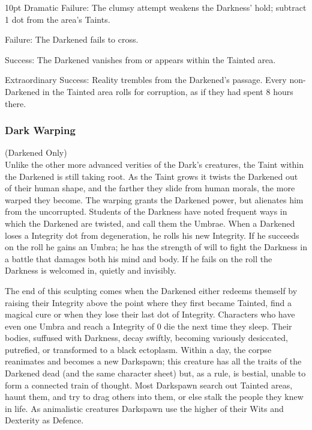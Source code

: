\begin{myindentpar}{10pt}
    Dramatic Failure: The clumsy attempt weakens the Darkness' hold; subtract 1 dot from the area's Taints. 
    
    Failure: The Darkened fails to cross. 
    
    Success: The Darkened vanishes from or appears within the Tainted area. 
    
    Extraordinary Success: Reality trembles from the Darkened's passage. Every non-Darkened in the Tainted area rolls for corruption, as if they had spent 8 hours there. 
\end{myindentpar}

\subsubsection*{Dark Warping}
(Darkened Only) \\

\noindent Unlike the other more advanced verities of the Dark's creatures, the Taint within the Darkened is still taking root. As the Taint grows it twists the Darkened out of their human shape, and the farther they slide from human morals, the more warped they become. The warping grants the Darkened power, but alienates him from the uncorrupted. Students of the Darkness have noted frequent ways in which the Darkened are twisted, and call them the Umbrae. When a Darkened loses a Integrity dot from degeneration, he rolls his new Integrity. If he succeeds on the roll he gains an Umbra; he has the strength of will to fight the Darkness in a battle that damages both his mind and body. If he fails on the roll the Darkness is welcomed in, quietly and invisibly. 

The end of this sculpting comes when the Darkened either redeems themself by raising their Integrity above the point where they first became Tainted, find a magical cure or when they lose their last dot of Integrity. Characters who have even one Umbra and reach a Integrity of 0 die the next time they sleep. Their bodies, suffused with Darkness, decay swiftly, becoming variously desiccated, putrefied, or transformed to a black ectoplasm. Within a day, the corpse reanimates and becomes a new Darkspawn; this creature has all the traits of the Darkened dead (and the same character sheet) but, as a rule, is bestial, unable to form a connected train of thought. Most Darkspawn search out Tainted areas, haunt them, and try to drag others into them, or else stalk the people they knew in life. As animalistic creatures Darkspawn use the higher of their Wits and Dexterity as Defence. 

